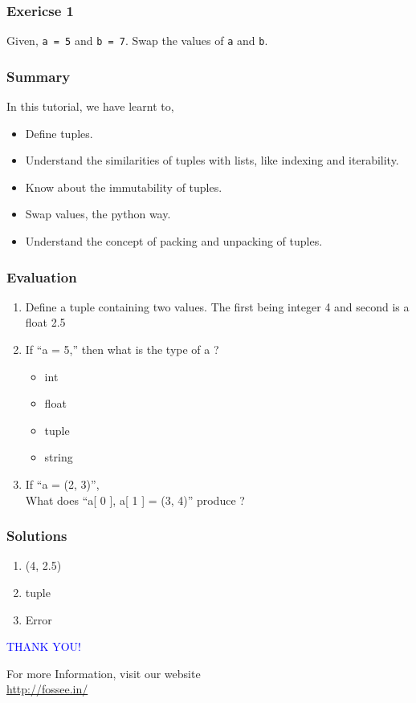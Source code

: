 \documentclass[presentation]{beamer}
\begin{document}
\begin{frame}
\frametitle{Exericse 1}
\label{sec-4}

  Given, \verb~a = 5~ and \verb~b = 7~. Swap the values of \verb~a~ and \verb~b~.
\end{frame}
\begin{frame}
\frametitle{Summary}
\label{sec-5}

  In this tutorial, we have learnt to,


\begin{itemize}
\item Define tuples.
\item Understand the similarities of tuples with lists, like indexing and 
    iterability.
\item Know about the immutability of tuples.
\item Swap values, the python way.
\item Understand the concept of packing and unpacking of tuples.
\end{itemize}
\end{frame}
\begin{frame}
\frametitle{Evaluation}
\label{sec-6}


\begin{enumerate}
\item Define a tuple containing two values. The first being integer 4 and 
   second is a float 2.5
\vspace{8pt}
\item If ``a = 5,'' then what is the type of a ?
\begin{itemize}
\item int
\item float
\item tuple
\item string
\end{itemize}
\vspace{8pt}
\item If ``a = (2, 3)'',\\ What does ``a[ 0 ], a[ 1 ] = (3, 4)'' produce ?
\end{enumerate}
\end{frame}
\begin{frame}
\frametitle{Solutions}
\label{sec-7}


\begin{enumerate}
\item (4, 2.5)
\vspace{12pt}
\item tuple
\vspace{12pt}
\item Error
\end{enumerate}
\end{frame}
\begin{frame}

  \begin{block}{}
  \begin{center}
  \textcolor{blue}{\Large THANK YOU!} 
  \end{center}
  \end{block}
\begin{block}{}
  \begin{center}
    For more Information, visit our website\\
    \url{http://fossee.in/}
  \end{center}  
  \end{block}
\end{frame}
\end{document}
